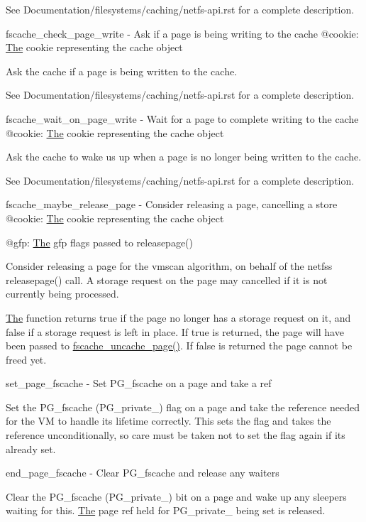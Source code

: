 See Documentation/filesystems/caching/netfs-\/api.\+rst for a complete description.

fscache\+\_\+check\+\_\+page\+\_\+write -\/ Ask if a page is being writing to the cache @cookie\+: \mbox{\hyperlink{classThe}{The}} cookie representing the cache object

Ask the cache if a page is being written to the cache.

See Documentation/filesystems/caching/netfs-\/api.\+rst for a complete description.

fscache\+\_\+wait\+\_\+on\+\_\+page\+\_\+write -\/ Wait for a page to complete writing to the cache @cookie\+: \mbox{\hyperlink{classThe}{The}} cookie representing the cache object

Ask the cache to wake us up when a page is no longer being written to the cache.

See Documentation/filesystems/caching/netfs-\/api.\+rst for a complete description.

fscache\+\_\+maybe\+\_\+release\+\_\+page -\/ Consider releasing a page, cancelling a store @cookie\+: \mbox{\hyperlink{classThe}{The}} cookie representing the cache object

@gfp\+: \mbox{\hyperlink{classThe}{The}} gfp flags passed to releasepage()

Consider releasing a page for the vmscan algorithm, on behalf of the netfs\textquotesingle{}s releasepage() call. A storage request on the page may cancelled if it is not currently being processed.

\mbox{\hyperlink{classThe}{The}} function returns true if the page no longer has a storage request on it, and false if a storage request is left in place. If true is returned, the page will have been passed to \mbox{\hyperlink{linux_2fscache_8h_a82d111ab184430c7f4e76372576cb69b}{fscache\+\_\+uncache\+\_\+page()}}. If false is returned the page cannot be freed yet.

set\+\_\+page\+\_\+fscache -\/ Set P\+G\+\_\+fscache on a page and take a ref

Set the P\+G\+\_\+fscache (P\+G\+\_\+private\+\_) flag on a page and take the reference needed for the VM to handle its lifetime correctly. This sets the flag and takes the reference unconditionally, so care must be taken not to set the flag again if it\textquotesingle{}s already set.

end\+\_\+page\+\_\+fscache -\/ Clear P\+G\+\_\+fscache and release any waiters

Clear the P\+G\+\_\+fscache (P\+G\+\_\+private\+\_) bit on a page and wake up any sleepers waiting for this. \mbox{\hyperlink{classThe}{The}} page ref held for P\+G\+\_\+private\+\_ being set is released.

